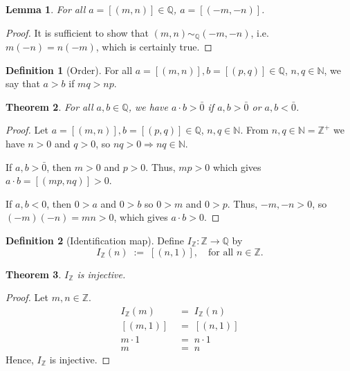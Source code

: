 \documentclass[10pt]{article}
\newtheorem{theorem}{Theorem}[section]
\newtheorem{lemma}[theorem]{Lemma}
\theoremstyle{definition}
\newtheorem*{definition}{Definition}
\theoremstyle{remark}
\newcommand{\N}{\mathbb{N}}
\newcommand{\Z}{\mathbb{Z}}
\newcommand{\Q}{\mathbb{Q}}
\newcommand{\simQ}{\sim_{\Q}}
\newcommand{\IdZ}{I_{\Z}}
\begin{document}
        \begin{lemma}
                For all $a = [(m, n)] \in \Q$, $a = [(-m, -n)]$.
        \end{lemma}
        \begin{proof}
                It is sufficient to show that $(m, n) \simQ (-m, -n)$, i.e.
                $m(-n) = n(-m)$, which is certainly true.
        \end{proof}

        \begin{definition}[Order]
                For all $a = [(m, n)], b = [(p, q)] \in \Q$, $n, q \in \N$, we say that
                $a > b$ if $mq > np$.
        \end{definition}
        
        \begin{theorem}
                For all $a, b \in \Q$, we have $a\cdot b > \bar{0}$ if $a, b > \bar{0}$ or $a, b < \bar{0}$.
        \end{theorem}
        \begin{proof}
                Let $a = [(m, n)], b = [(p, q)] \in \Q$, $n, q \in \N$.
                From $n, q \in \N = \Z^+$ we have $n > 0$ and $q > 0$, so $nq > 0\Rightarrow nq \in \N$.

                If $a, b > \bar{0}$, then $m > 0$ and $p > 0$.
                Thus, $mp > 0$ which gives $a\cdot b = [(mp, nq)] > 0$.

                If $a, b < 0$, then $0 > a$ and $0 > b$ so $0 > m$ and $0 > p$.
                Thus, $-m, -n > 0$, so $(-m)(-n) = mn > 0$, which gives $a\cdot b > 0$.
        \end{proof}

        \begin{definition}[Identification map]
                Define $\IdZ\colon \Z\to \Q$ by 
                \[
                        \IdZ(n) \;:=\; [(n, 1)],\quad\text{for all }n\in \Z.
                \]
        \end{definition}

        \begin{theorem}
                $\IdZ$ is injective.
        \end{theorem}
        \begin{proof}
                Let $m, n \in \Z$.
                \begin{align*}
                        \IdZ(m) \;&=\; \IdZ(n) \\
                        [(m, 1)] \;&=\; [(n, 1)] \\
                        m\cdot 1\;&=\; n\cdot 1 \\
                        m \;&=\; n
                \end{align*}
                Hence, $\IdZ$ is injective.
        \end{proof}
\end{document}
